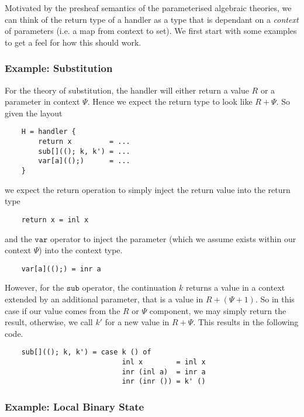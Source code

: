\documentclass{scrartcl}
\theoremstyle{definition}
\newcommand{\sub}{\mathtt{sub}}
\newcommand{\var}{\mathtt{var}}
\newcommand{\PCtx}{\Psi}
\begin{document}
Motivated by the presheaf semantics of the parameterised algebraic theories, we can think of the return type of a handler as a type that is dependant on a \emph{context} of parameters (i.e. a map from context to set). We first start with some examples to get a feel for how this should work.

\subsubsection{Example: Substitution}

For the theory of substitution, the handler will either return a value $R$ or a parameter in context $\PCtx$. Hence we expect the return type to look like $R+\PCtx$. So given the layout
\begin{lstlisting}
    H = handler {
        return x         = ...
        sub[]((); k, k') = ...
        var[a](();)      = ...
    }
\end{lstlisting}
we expect the return operation to simply inject the return value into the return type
\begin{lstlisting}
    return x = inl x
\end{lstlisting}
and the $\var$ operator to inject the parameter (which we assume exists within our context $\PCtx$) into the context type.
\begin{lstlisting}
    var[a](();) = inr a
\end{lstlisting}
However, for the $\sub$ operator, the continuation $k$ returns a value in a context extended by an additional parameter, that is a value in $R + (\PCtx + 1)$. So in this case if our value comes from the $R$ or $\PCtx$ component, we may simply return the result, otherwise, we call $k'$ for a new value in $R+\PCtx$. This results in the following code.
\begin{lstlisting}
    sub[]((); k, k') = case k () of
                            inl x        = inl x
                            inr (inl a)  = inr a
                            inr (inr ()) = k' ()
\end{lstlisting}

\subsubsection{Example: Local Binary State}
\end{document}
